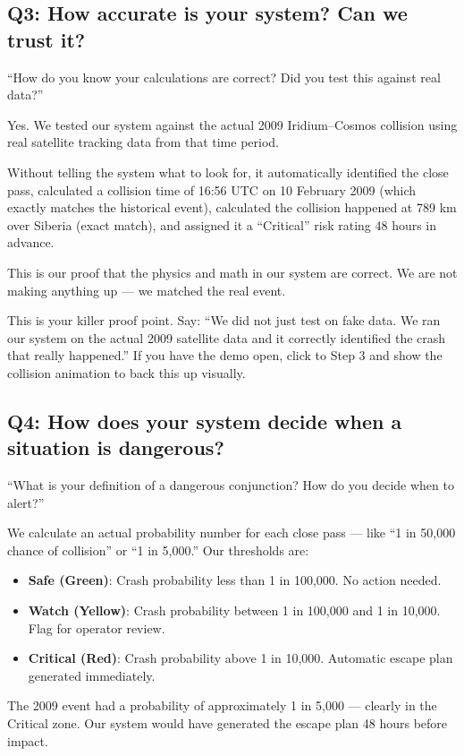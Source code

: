 \documentclass[11pt,a4paper]{article}
\begin{document}
\subsection*{Q3: How accurate is your system? Can we trust it?}

\begin{questionbox}
``How do you know your calculations are correct? Did you test this against real data?''
\end{questionbox}

\begin{answerbox}
Yes. We tested our system against the actual 2009 Iridium--Cosmos collision using real satellite tracking data from that time period.

Without telling the system what to look for, it automatically identified the close pass, calculated a collision time of 16:56 UTC on 10 February 2009 (which exactly matches the historical event), calculated the collision happened at 789 km over Siberia (exact match), and assigned it a ``Critical'' risk rating 48 hours in advance.

This is our proof that the physics and math in our system are correct. We are not making anything up --- we matched the real event.
\end{answerbox}

\begin{tipbox}
This is your killer proof point. Say: ``We did not just test on fake data. We ran our system on the actual 2009 satellite data and it correctly identified the crash that really happened.'' If you have the demo open, click to Step 3 and show the collision animation to back this up visually.
\end{tipbox}

\vspace{1em}
\subsection*{Q4: How does your system decide when a situation is dangerous?}

\begin{questionbox}
``What is your definition of a dangerous conjunction? How do you decide when to alert?''
\end{questionbox}

\begin{answerbox}
We calculate an actual probability number for each close pass --- like ``1 in 50,000 chance of collision'' or ``1 in 5,000.'' Our thresholds are:
\begin{itemize}
    \item \textbf{Safe (Green)}: Crash probability less than 1 in 100,000. No action needed.
    \item \textbf{Watch (Yellow)}: Crash probability between 1 in 100,000 and 1 in 10,000. Flag for operator review.
    \item \textbf{Critical (Red)}: Crash probability above 1 in 10,000. Automatic escape plan generated immediately.
\end{itemize}
The 2009 event had a probability of approximately 1 in 5,000 --- clearly in the Critical zone. Our system would have generated the escape plan 48 hours before impact.
\end{answerbox}
\end{document}
